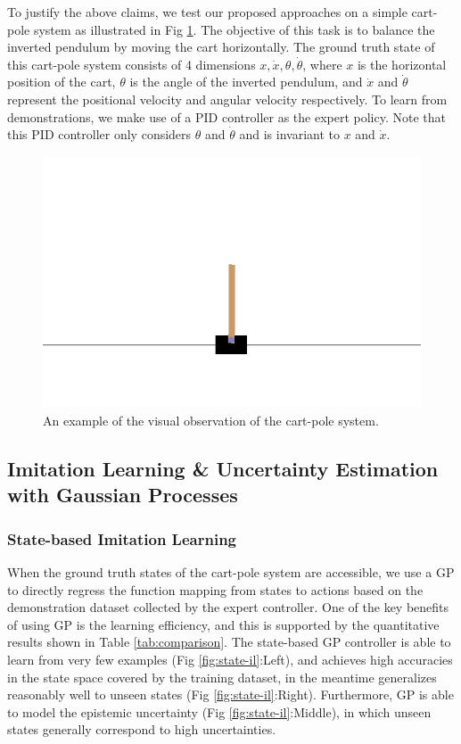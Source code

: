 \documentclass[11pt, reqno, letterpaper, twoside]{amsart}
\begin{document}
To justify the above claims, we test our proposed approaches on a simple cart-pole system as illustrated in Fig \ref{fig:cart-pole}. The objective of this task is to balance the inverted pendulum by moving the cart horizontally. The ground truth state of this cart-pole system consists of 4 dimensions $x, \Dot{x}, \theta, \Dot{\theta}$, where $x$ is the horizontal position of the cart, $\theta$ is the angle of the inverted pendulum, and $\Dot{x}$ and $\Dot{\theta}$ represent the positional velocity and angular velocity respectively. To learn from demonstrations, we make use of a PID controller as the expert policy. Note that this PID controller only considers $\theta$ and $\Dot{\theta}$ and is invariant to $x$ and $\Dot{x}$.

\begin{figure}[ht]
\centering
\includegraphics[width=0.5\linewidth]{imgs/random_rollout3.jpg}
\caption{An example of the visual observation of the cart-pole system.}
\label{fig:cart-pole}
\end{figure}

\subsection{Imitation Learning \& Uncertainty Estimation with Gaussian Processes}
\subsubsection{State-based Imitation Learning}
When the ground truth states of the cart-pole system are accessible, we use a GP to directly regress the function mapping from states to actions based on the demonstration dataset collected by the expert controller. One of the key benefits of using GP is the learning efficiency, and this is supported by the quantitative results shown in Table \ref{tab:comparison}. The state-based GP controller is able to learn from very few examples (Fig \ref{fig:state-il}:Left), and achieves high accuracies in the state space covered by the training dataset, in the meantime generalizes reasonably well to unseen states (Fig \ref{fig:state-il}:Right). Furthermore, GP is able to model the epistemic uncertainty (Fig \ref{fig:state-il}:Middle), in which unseen states generally correspond to high uncertainties.
\end{document}

